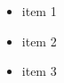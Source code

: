 \documentclass{beamer}
\begin{document}
\begin{frame}
  \begin{itemize}[<+-| alert@+>]
      \item \alert<4>{item 1}
      \item item 2
      \item item 3 
  \end{itemize}
\end{frame}
\end{document}
